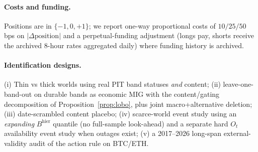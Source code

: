 \documentclass[12pt]{article}
\begin{document}
\paragraph{Costs and funding.}
Positions are in $\{-1,0,+1\}$; we report one-way proportional costs of $10/25/50$ bps on $|\Delta\mathrm{position}|$ and a perpetual-funding adjustment (longs pay, shorts receive the archived 8-hour rates aggregated daily) where funding history is archived.

\paragraph{Identification designs.}
(i) Thin vs thick worlds using real PIT band statuses \emph{and} content; (ii) leave-one-band-out on durable bands as economic MIG with the content/gating decomposition of Proposition~\ref{prop:lobo}, plus joint macro+alternative deletion; (iii) date-scrambled content placebo; (iv) scarce-world event study using an \emph{expanding} $B^{\mathrm{hier}}$ quantile (no full-sample look-ahead) and a separate hard $O_t$ availability event study when outages exist; (v) a 2017--2026 long-span external-validity audit of the action rule on BTC/ETH.
\end{document}
